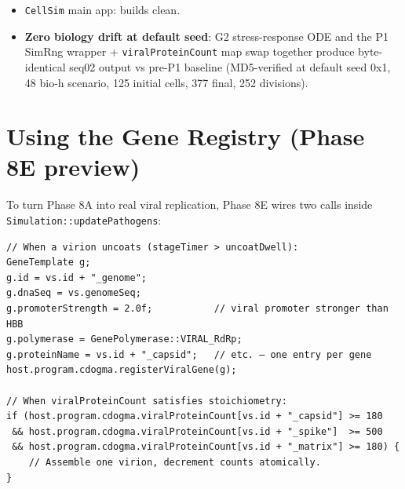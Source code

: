 \documentclass[11pt,letterpaper,twoside,openany]{book}
\newcommand{\code}[1]{\texttt{#1}}
\begin{document}
\begin{itemize}
        The p53(damage)/p53(control) ratio = 2.9, demonstrating
        mechanism specificity rather than constitutive activation.
        Simple 2-variable ODE (G2) settles to a stable elevated p53
        under sustained damage. Phase~G3 added an MDM2-mRNA
        intermediate with Hill (n=8) transactivation — exactly the
        Geva-Zatorsky 2006 3-variable delay topology — and now
        reproduces Purvis-2012-style sustained oscillation:
        7 p53 peaks detected across a 24-h damage window at
        damageLevel=0.30, mean period $\approx 3.03$ h, period
        shortening with increased stress (gate g: period(0.35) $<$
        period(0.30)), no peaks under control (damageLevel=0).
        All eight combined gates (G2 a-d + G3 e-h) pass across
        five pinned seeds (0x1, 0xCE11517E, 0xDEADBEEF, 0x2,
        0xFFFFFFFE).
  \item \code{CellSim} main app: builds clean.
  \item \textbf{Zero biology drift at default seed}: G2 stress-response
        ODE and the P1 SimRng wrapper + \code{viralProteinCount} map
        swap together produce byte-identical seq02 output vs pre-P1
        baseline (MD5-verified at default seed 0x1, 48 bio-h scenario,
        125 initial cells, 377 final, 252 divisions).
\end{itemize}

\chapter{Using the Gene Registry (Phase 8E preview)}
\label{ch:phase8a-use}

To turn Phase 8A into real viral replication, Phase 8E wires two
calls inside \code{Simulation::updatePathogens}:

\begin{lstlisting}
// When a virion uncoats (stageTimer > uncoatDwell):
GeneTemplate g;
g.id = vs.id + "_genome";
g.dnaSeq = vs.genomeSeq;
g.promoterStrength = 2.0f;           // viral promoter stronger than HBB
g.polymerase = GenePolymerase::VIRAL_RdRp;
g.proteinName = vs.id + "_capsid";   // etc. — one entry per gene
host.program.cdogma.registerViralGene(g);

// When viralProteinCount satisfies stoichiometry:
if (host.program.cdogma.viralProteinCount[vs.id + "_capsid"] >= 180
 && host.program.cdogma.viralProteinCount[vs.id + "_spike"]  >= 500
 && host.program.cdogma.viralProteinCount[vs.id + "_matrix"] >= 180) {
    // Assemble one virion, decrement counts atomically.
}
\end{lstlisting}
\end{document}
